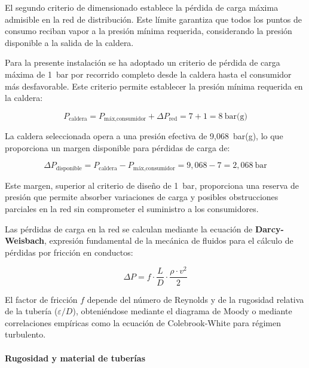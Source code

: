 \documentclass[12pt]{article}
\begin{document}
El segundo criterio de dimensionado establece la pérdida de carga máxima admisible en la red de distribución. Este límite garantiza que todos los puntos de consumo reciban vapor a la presión mínima requerida, considerando la presión disponible a la salida de la caldera.

Para la presente instalación se ha adoptado un criterio de pérdida de carga máxima de 1~bar por recorrido completo desde la caldera hasta el consumidor más desfavorable. Este criterio permite establecer la presión mínima requerida en la caldera:

\begin{equation}
	P_{\text{caldera}} = P_{\text{máx,consumidor}} + \Delta P_{\text{red}} = 7 + 1 = 8 \ \text{bar(g)}
	\label{eq:presion-minima-caldera}
\end{equation}

La caldera seleccionada opera a una presión efectiva de 9,068~bar(g), lo que proporciona un margen disponible para pérdidas de carga de:

\begin{equation}
	\Delta P_{\text{disponible}} = P_{\text{caldera}} - P_{\text{máx,consumidor}} = 9{,}068 - 7 = 2{,}068 \ \text{bar}
	\label{eq:margen-presion-disponible}
\end{equation}

Este margen, superior al criterio de diseño de 1~bar, proporciona una reserva de presión que permite absorber variaciones de carga y posibles obstrucciones parciales en la red sin comprometer el suministro a los consumidores.

Las pérdidas de carga en la red se calculan mediante la ecuación de \textbf{Darcy-Weisbach}, expresión fundamental de la mecánica de fluidos para el cálculo de pérdidas por fricción en conductos:

\begin{equation}
	\Delta P = f \cdot \frac{L}{D} \cdot \frac{\rho \cdot v^2}{2}
	\label{eq:darcy-weisbach}
\end{equation}


El factor de fricción $f$ depende del número de Reynolds y de la rugosidad relativa de la tubería ($\varepsilon/D$), obteniéndose mediante el diagrama de Moody o mediante correlaciones empíricas como la ecuación de Colebrook-White para régimen turbulento.

\paragraph{Rugosidad y material de tuberías}
\end{document}
